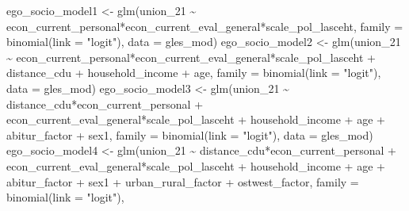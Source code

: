 \documentclass[
]{article}
\newenvironment{Shaded}{\begin{snugshade}}{\end{snugshade}}
\newcommand{\AttributeTok}[1]{\textcolor[rgb]{0.77,0.63,0.00}{#1}}
\newcommand{\FunctionTok}[1]{\textcolor[rgb]{0.00,0.00,0.00}{#1}}
\newcommand{\NormalTok}[1]{#1}
\newcommand{\OtherTok}[1]{\textcolor[rgb]{0.56,0.35,0.01}{#1}}
\newcommand{\SpecialCharTok}[1]{\textcolor[rgb]{0.00,0.00,0.00}{#1}}
\newcommand{\StringTok}[1]{\textcolor[rgb]{0.31,0.60,0.02}{#1}}
\begin{document}
\begin{Shaded}
\begin{Highlighting}[]
\NormalTok{ego\_socio\_model1 }\OtherTok{\textless{}{-}} \FunctionTok{glm}\NormalTok{(union\_21 }\SpecialCharTok{\textasciitilde{}}\NormalTok{ econ\_current\_personal}\SpecialCharTok{*}\NormalTok{econ\_current\_eval\_general}\SpecialCharTok{*}\NormalTok{scale\_pol\_lasceht,}
                       \AttributeTok{family =} \FunctionTok{binomial}\NormalTok{(}\AttributeTok{link =} \StringTok{"logit"}\NormalTok{),}
                       \AttributeTok{data =}\NormalTok{ gles\_mod)}
\NormalTok{ego\_socio\_model2 }\OtherTok{\textless{}{-}} \FunctionTok{glm}\NormalTok{(union\_21 }\SpecialCharTok{\textasciitilde{}}\NormalTok{ econ\_current\_personal}\SpecialCharTok{*}\NormalTok{econ\_current\_eval\_general}\SpecialCharTok{*}\NormalTok{scale\_pol\_lasceht }\SpecialCharTok{+}\NormalTok{ distance\_cdu }\SpecialCharTok{+}\NormalTok{  household\_income }\SpecialCharTok{+}\NormalTok{ age,}
                       \AttributeTok{family =} \FunctionTok{binomial}\NormalTok{(}\AttributeTok{link =} \StringTok{"logit"}\NormalTok{),}
                       \AttributeTok{data =}\NormalTok{ gles\_mod)}
\NormalTok{ego\_socio\_model3 }\OtherTok{\textless{}{-}} \FunctionTok{glm}\NormalTok{(union\_21 }\SpecialCharTok{\textasciitilde{}}\NormalTok{ distance\_cdu}\SpecialCharTok{*}\NormalTok{econ\_current\_personal }\SpecialCharTok{+}\NormalTok{ econ\_current\_eval\_general}\SpecialCharTok{*}\NormalTok{scale\_pol\_lasceht }\SpecialCharTok{+}\NormalTok{  household\_income }\SpecialCharTok{+}\NormalTok{ age }\SpecialCharTok{+}\NormalTok{ abitur\_factor }\SpecialCharTok{+}\NormalTok{ sex1,}
                       \AttributeTok{family =} \FunctionTok{binomial}\NormalTok{(}\AttributeTok{link =} \StringTok{"logit"}\NormalTok{),}
                       \AttributeTok{data =}\NormalTok{ gles\_mod)}
\NormalTok{ego\_socio\_model4 }\OtherTok{\textless{}{-}} \FunctionTok{glm}\NormalTok{(union\_21 }\SpecialCharTok{\textasciitilde{}}\NormalTok{ distance\_cdu}\SpecialCharTok{*}\NormalTok{econ\_current\_personal }\SpecialCharTok{+}\NormalTok{ econ\_current\_eval\_general}\SpecialCharTok{*}\NormalTok{scale\_pol\_lasceht }\SpecialCharTok{+}\NormalTok{  household\_income }\SpecialCharTok{+}\NormalTok{ age }\SpecialCharTok{+}\NormalTok{ abitur\_factor }\SpecialCharTok{+}\NormalTok{ sex1 }\SpecialCharTok{+}\NormalTok{ urban\_rural\_factor }\SpecialCharTok{+}\NormalTok{ ostwest\_factor,}
                       \AttributeTok{family =} \FunctionTok{binomial}\NormalTok{(}\AttributeTok{link =} \StringTok{"logit"}\NormalTok{),}

\end{Highlighting}
\end{Shaded}
\end{document}
